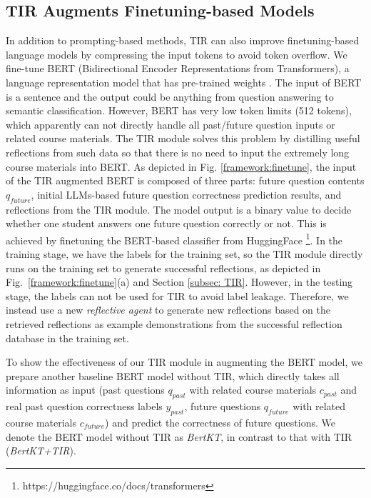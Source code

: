 \subsection{TIR Augments Finetuning-based Models}
In addition to prompting-based methods, TIR can also improve finetuning-based language models by compressing the input tokens to avoid token overflow. We fine-tune BERT (Bidirectional Encoder Representations from Transformers), a language representation model that has pre-trained weights \cite{DBLP:journals/corr/abs-1810-04805}. The input of BERT is a sentence and the output could be anything from question answering to semantic classification. However, BERT has very low token limits (512 tokens), which apparently can not directly handle all past/future question inputs or related course materials. The TIR module solves this problem by distilling useful reflections from such data so that there is no need to input the extremely long course materials into BERT.
As depicted in Fig. \ref{framework:finetune}, the input of the TIR augmented BERT is composed of three parts: future question contents $q_{future}$, initial LLMs-based future question correctness prediction results, and reflections from the TIR module. The model output is a binary value to decide whether one student answers one future question correctly or not. This is achieved by finetuning the BERT-based classifier from HuggingFace \footnote{https://huggingface.co/docs/transformers}.
In the training stage, we have the labels for the training set, so the TIR module directly runs on the training set to generate successful reflections, as depicted in Fig.~\ref{framework:finetune}(a) and Section \ref{subsec: TIR}. However, in the testing stage, the labels can not be used for TIR to avoid label leakage. Therefore, we instead use a new \textit{reflective agent} to generate new reflections based on the retrieved reflections as example demonstrations from the successful reflection database in the training set. 



To show the effectiveness of our TIR module in augmenting the BERT model, we prepare another baseline BERT model without TIR, which directly takes all information as input (past questions $q_{past}$ with related course materials $c_{past}$ and real past question correctness labels $y_{past}$, future questions $q_{future}$ with related course materials $c_{future}$) and predict the correctness of future questions.
%
We denote the BERT model without TIR as \textit{BertKT}, in contrast to that with TIR (\textit{BertKT+TIR}). 

